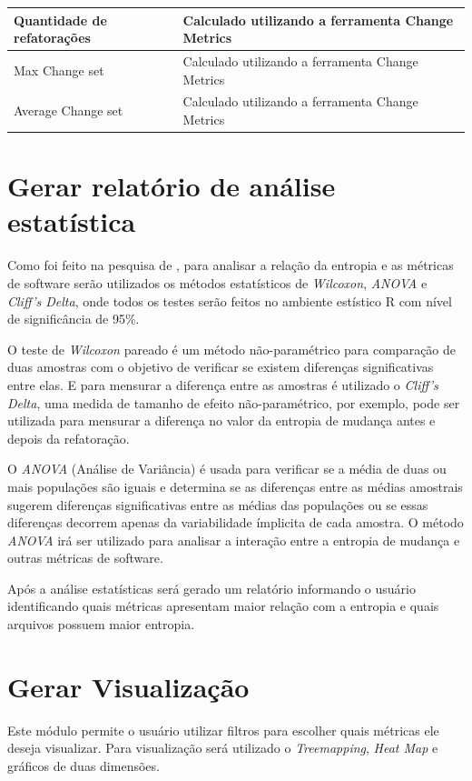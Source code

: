 \begin{table}[H]
\begin{tabular}{|p{3cm}|p{12cm}|}
Quantidade de refatorações          & Calculado utilizando a ferramenta Change Metrics                                            \\ \hline
Max Change set                      & Calculado utilizando a ferramenta Change Metrics                                            \\ \hline
Average Change set                  & Calculado utilizando a ferramenta Change Metrics                                            \\ \hline
\end{tabular}
\end{table}

\section{Gerar relatório de análise estatística}
Como foi feito na pesquisa de , para analisar a relação da entropia e as métricas de software serão utilizados os métodos estatísticos de \textit{Wilcoxon}, \textit{ANOVA} e \textit{Cliff's Delta}, onde todos os testes serão feitos no ambiente estístico R com nível de significância de 95\%.

O teste de \textit{Wilcoxon} pareado é um método não-paramétrico para comparação de duas amostras com o objetivo de verificar se existem diferenças significativas entre elas. E para mensurar a diferença entre as amostras é utilizado o \textit{Cliff's Delta}, uma medida de tamanho de efeito não-paramétrico, por exemplo, pode ser utilizada para mensurar a diferença no valor da entropia de mudança antes e depois da refatoração.

O \textit{ANOVA} (Análise de Variância) é usada para verificar se a média de duas ou mais populações são iguais e determina se as diferenças entre as médias amostrais sugerem diferenças significativas entre as médias das populações ou se essas diferenças decorrem apenas da variabilidade ímplicita de cada amostra. O método \textit{ANOVA} irá ser utilizado para analisar a interação entre a entropia de mudança e outras métricas de software. 

Após a análise estatísticas será gerado um relatório informando o usuário identificando quais métricas apresentam maior relação com a entropia e quais arquivos possuem maior entropia.

\section{Gerar Visualização}
Este módulo permite o usuário utilizar filtros para escolher quais métricas ele deseja visualizar. Para visualização será utilizado o \textit{Treemapping}, \textit{Heat Map} e gráficos de duas dimensões.

